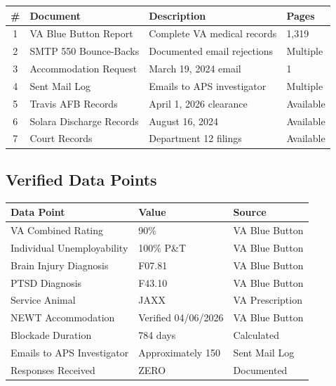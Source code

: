 \documentclass[12pt,letterpaper]{article}
\begin{document}
\begin{center}
\begin{longtable}{clll}
\toprule
\textbf{\#} & \textbf{Document} & \textbf{Description} & \textbf{Pages} \\
\midrule
\endhead
1 & VA Blue Button Report & Complete VA medical records & 1,319 \\
2 & SMTP 550 Bounce-Backs & Documented email rejections & Multiple \\
3 & Accommodation Request & March 19, 2024 email & 1 \\
4 & Sent Mail Log & Emails to APS investigator & Multiple \\
5 & Travis AFB Records & April 1, 2026 clearance & Available \\
6 & Solara Discharge Records & August 16, 2024 & Available \\
7 & Court Records & Department 12 filings & Available \\
\bottomrule
\end{longtable}
\end{center}

\subsection{Verified Data Points}

\begin{center}
\begin{tabular}{lll}
\toprule
\textbf{Data Point} & \textbf{Value} & \textbf{Source} \\
\midrule
VA Combined Rating & 90\% & VA Blue Button \\
Individual Unemployability & 100\% P\&T & VA Blue Button \\
Brain Injury Diagnosis & F07.81 & VA Blue Button \\
PTSD Diagnosis & F43.10 & VA Blue Button \\
Service Animal & JAXX & VA Prescription \\
NEWT Accommodation & Verified 04/06/2026 & VA Blue Button \\
Blockade Duration & 784 days & Calculated \\
Emails to APS Investigator & Approximately 150 & Sent Mail Log \\
Responses Received & ZERO & Documented \\
\bottomrule
\end{tabular}
\end{center}

\newpage
\end{document}
